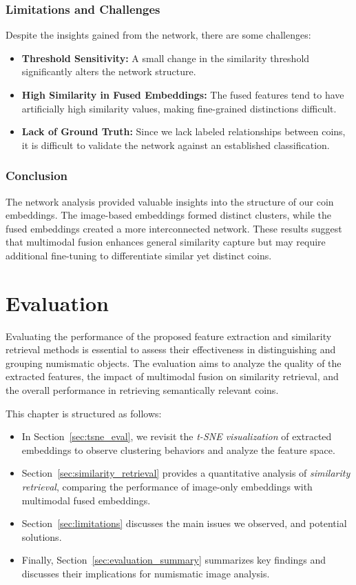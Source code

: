 \documentclass[nolibertine, english, algorithm, nomencl, minted]{ttlab-qualify}
\begin{document}
\subsection{Limitations and Challenges}
Despite the insights gained from the network, there are some challenges:
\begin{itemize}
    \item \textbf{Threshold Sensitivity:} A small change in the similarity threshold significantly alters the network structure.
    \item \textbf{High Similarity in Fused Embeddings:} The fused features tend to have artificially 
    high similarity values, making fine-grained distinctions difficult.
    \item \textbf{Lack of Ground Truth:} Since we lack labeled relationships between coins, it is difficult to validate 
    the network against an established classification.
\end{itemize}

\subsection{Conclusion}
The network analysis provided valuable insights into the structure of our coin embeddings. 
The image-based embeddings formed distinct clusters, while the fused embeddings created a more interconnected network. 
These results suggest that multimodal fusion enhances general similarity capture but may require additional 
fine-tuning to differentiate similar yet distinct coins.


\chapter{Evaluation}
Evaluating the performance of the proposed feature extraction and similarity retrieval methods is essential 
to assess their effectiveness in distinguishing and grouping numismatic objects. The evaluation aims to analyze 
the quality of the extracted features, the impact of multimodal fusion on similarity retrieval, and the overall 
performance in retrieving semantically relevant coins.

This chapter is structured as follows:
\begin{itemize}
    \item In Section~\ref{sec:tsne_eval}, we revisit the \textit{t-SNE visualization} of extracted embeddings to 
    observe clustering behaviors and analyze the feature space.
    \item Section~\ref{sec:similarity_retrieval} provides a quantitative analysis of \textit{similarity retrieval}, 
    comparing the performance of image-only embeddings with multimodal fused embeddings.
    \item Section~\ref{sec:limitations} discusses the main issues we observed, and potential solutions.
    \item Finally, Section~\ref{sec:evaluation_summary} summarizes key findings and discusses their implications for 
    numismatic image analysis.
\end{itemize}
\end{document}
